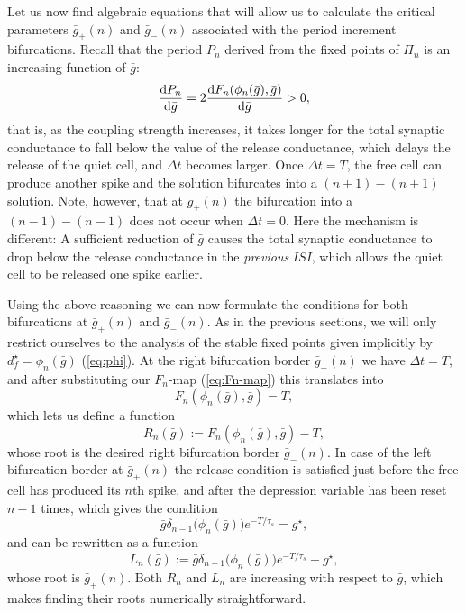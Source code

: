 \documentclass[utf8,draft]{frontiersFPHY} %
\newcommand{\dstar}{d^\star}
\newcommand{\gstar}{g^\star}
\newcommand{\gbar}{\bar g}
\newcommand{\delt}{\Delta t}
\newcommand{\taus}{\tau_s}
\begin{document}
Let us now find algebraic equations that will allow us to calculate the critical parameters $\gbar_+(n)$ and $\gbar_-(n)$ associated with the period increment bifurcations.
Recall that the period $P_n$ derived from the fixed points of $\Pi_n$ is an increasing function of $\gbar$:
\begin{equation}
  \dv{P_{n}}{\gbar}=2\dv{F_n(\phi_n(\gbar), \gbar)}{\gbar}>0,
\end{equation}
that is, as the coupling strength increases, it takes longer for the total synaptic conductance to fall below the value of the release conductance, which delays the release of the quiet cell, and $\delt$ becomes larger.
Once $\delt=T$, the free cell can produce another spike and the solution bifurcates into a $(n+1)-(n+1)$ solution.
Note, however, that at $\gbar_+(n)$ the bifurcation into a $(n-1)-(n-1)$ does not occur when $\delt=0$.
Here the mechanism is different: A sufficient reduction of $\gbar$ causes the total synaptic conductance to drop below the release conductance in the \emph{previous} $ISI$, which allows the quiet cell to be released one spike earlier.

Using the above reasoning we can now formulate the conditions for both bifurcations at $\gbar_+(n)$ and $\gbar_-(n)$.
As in the previous sections, we will only restrict ourselves to the analysis of the stable fixed points given implicitly by $\dstar_f=\phi_n(\gbar)$ (\cref{eq:phi}).
At the right bifurcation border $\gbar_-(n)$ we have $\delt=T$, and after substituting our $F_{n}$-map (\cref{eq:Fn-map}) this translates into
\begin{equation}
  F_n(\phi_n(\gbar), \gbar) = T,
\end{equation}
which lets us define a function
\begin{equation}
  \label{eq:R}
  R_{n}(\gbar):=F_n(\phi_n(\gbar), \gbar)-T,
\end{equation}
whose root is the desired right bifurcation border $\gbar_-(n)$.
In case of the left bifurcation border at $\gbar_+(n)$ the release condition is satisfied just before the free cell has produced its $n$th spike, and after the depression variable has been reset $n-1$ times, which gives the condition
\begin{equation}
  \gbar \delta_{n-1}\big(\phi_{n}(\gbar)\big)e^{-T/\taus} = \gstar,
\end{equation}
and can be rewritten as a function
\begin{equation}
  \label{eq:L}
  L_{n}(\gbar):=\gbar \delta_{n-1}\big(\phi_{n}(\gbar)\big)e^{-T/\taus} -\gstar,
\end{equation}
whose root is $\gbar_+(n)$.
Both $R_{n}$ and $L_{n}$ are increasing with respect to $\gbar$, which makes finding their roots numerically straightforward.
\end{document}
